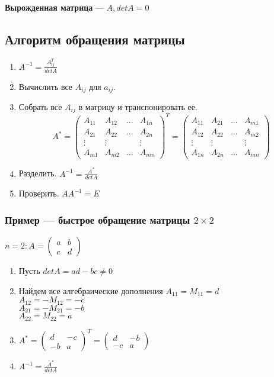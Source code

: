 \documentclass{article}
\begin{document}
\textbf{Вырожденная матрица} --- $A, det A = 0$

\subsection{Алгоритм обращения матрицы}

\begin{enumerate}
	\item $A^{-1} = \frac{A_{ij}^T}{det A}$
	\item Вычислить все $A_{ij}$ для $a_{ij}$.
	\item Собрать все $A_{ij}$ в матрицу и транспонировать ее.
	\[
	A^* = \begin{pmatrix}
		A_{11} & A_{12} & \dots & A_{1n} \\
		A_{21} & A_{22} & \dots & A_{2n} \\
		\vdots & \vdots & & \vdots \\
		A_{m1} & A_{m2} & \dots & A_{mn}
	\end{pmatrix}^T =
	\begin{pmatrix}
		A_{11} & A_{21} & \dots & A_{m1} \\
		A_{12} & A_{22} & \dots & A_{m2} \\
		\vdots & \vdots & & \vdots \\
		A_{1n} & A_{2n} & \dots & A_{mn}
	\end{pmatrix}
	\]
	\item Разделить. $A^{-1} = \frac{A^*}{det A}$
	\item Проверить. $A A^{-1} = E$
\end{enumerate}

\subsubsection{Пример --- быстрое обращение матрицы $2 \times 2$}

$
n = 2 : A = \begin{pmatrix}
	a & b \\
	c & d
\end{pmatrix}
$
\begin{enumerate}
	\item Пусть $det A = ad - bc \ne 0$
	\item Найдем все алгебраические дополнения $A_{11} = M_{11} = d$\\
	$A_{12} = -M_{12} = -c$\\
	$A_{21} = -M_{21} = -b$\\
	$A_{22} = M_{22} = a$\\
	\item $A^* = \begin{pmatrix}
		d & -c \\
		-b & a
	\end{pmatrix}^T =
	\begin{pmatrix}
		d & -b \\
		-c & a
	\end{pmatrix}$
	\item $A^{-1} = \frac{A^*}{det A}$
\end{enumerate}
\end{document}
